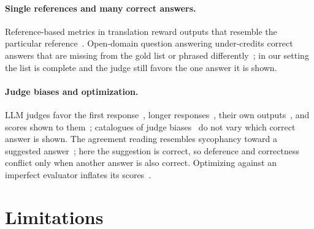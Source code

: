 \documentclass{article}
\begin{document}
\paragraph{Single references and many correct answers.}
Reference-based metrics in translation reward outputs that resemble the particular reference~\citep{freitag2020bleu,fomicheva2016reference}. Open-domain question answering under-credits correct answers that are missing from the gold list or phrased differently~\citep{min2020ambigqa,si2021whatsinaname,bulian2022tomayto,kamalloo2023evaluating}; in our setting the list is complete and the judge still favors the one answer it is shown.

\paragraph{Judge biases and optimization.}
LLM judges favor the first response~\citep{wang2024fair}, longer responses~\citep{dubois2024lengthcontrolled}, their own outputs~\citep{panickssery2024llm}, and scores shown to them~\citep{kapetanovic2026anchoring}; catalogues of judge biases~\citep{koo2024benchmarking,ye2025justice} do not vary which correct answer is shown. The agreement reading resembles sycophancy toward a suggested answer~\citep{sharma2023sycophancy,turpin2023unfaithful}; here the suggestion is correct, so deference and correctness conflict only when another answer is also correct. Optimizing against an imperfect evaluator inflates its scores~\citep{gao2022scaling,rafailov2024scaling}.

\section{Limitations}
\label{sec:limits}
\end{document}
